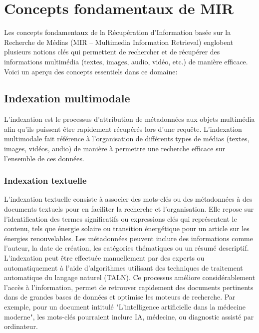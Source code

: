 
\begin{section}

 \chapter{Concepts fondamentaux de MIR}
 Les concepts fondamentaux de la Récupération d'Information basée sur la
 Recherche de Médias (MIR -- Multimedia Information Retrieval) englobent
 plusieurs notions clés qui permettent de rechercher et de récupérer des
 informations multimédia (textes, images, audio, vidéo, etc.) de manière
 efficace. Voici un aperçu des concepts essentiels dans ce domaine:
 \setcounter{section}{1}
 \section{Indexation multimodale}

 L'indexation est le processus d'attribution de métadonnées aux objets
 multimédia afin qu'ils puissent être rapidement récupérés lors d'une requête.
 L'indexation multimodale fait référence à l'organisation de différents types de
 médias (textes, images, vidéos, audio) de manière à permettre une recherche
 efficace sur l'ensemble de ces données.

 \subsection{Indexation textuelle}
 L’indexation textuelle consiste à associer des mots-clés ou des métadonnées à
 des documents textuels pour en faciliter la recherche et l’organisation. Elle
 repose sur l’identification des termes significatifs ou expressions clés qui
 représentent le contenu, tels que énergie solaire ou transition énergétique
 pour un article sur les énergies renouvelables. Les métadonnées peuvent inclure
 des informations comme l’auteur, la date de création, les catégories
 thématiques ou un résumé descriptif. L’indexation peut être effectuée
 manuellement par des experts ou automatiquement à l’aide d’algorithmes
 utilisant des techniques de traitement automatique du langage naturel (TALN).
 Ce processus améliore considérablement l’accès à l’information, permet de
 retrouver rapidement des documents pertinents dans de grandes bases de données
 et optimise les moteurs de recherche. Par exemple, pour un document intitulé
 "L'intelligence artificielle dans la médecine moderne", les mots-clés
 pourraient inclure IA, médecine, ou diagnostic assisté par ordinateur.

\end{section}
